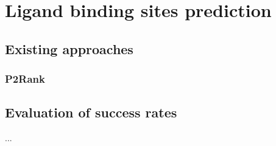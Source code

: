 \chapter{Ligand binding sites prediction}

\section{Existing approaches}

\subsection{P2Rank}

\section{Evaluation of success rates}


...